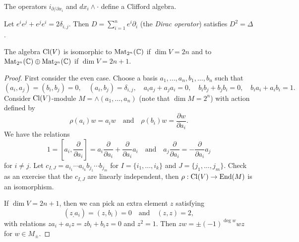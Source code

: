 \begin{example}
  The operators
  $i_{\partial / \partial x_i}$
  and $dx_i \wedge \cdot$
  define a Clifford algebra.
\end{example}

\begin{example}
  Let $e^i e^j + e^j e^i = 2 \delta_{i, j}$.
  Then $D = \sum_{i = 1}^n e^i \partial_i$
  (the \emph{Dirac operator})
  satisfies $D^2 = \Delta$.
\end{example}

\begin{theorem}
  The algebra $\operatorname{Cl}(V)$ is isomorphic
  to $\operatorname{Mat}_{2^n}(\mathbb{C})$ if
  $\dim V = 2n$ and to
  $\operatorname{Mat}_{2^n}(\mathbb{C}) \oplus \operatorname{Mat}_{2^n}(\mathbb{C})$
  if $\dim V = 2n + 1$.
\end{theorem}

\begin{proof}
  First consider the even case.
  Choose a basis $a_1, \dots, a_n, b_1, \dots, b_n$
  such that
  \[
    (a_i, a_j)
    = (b_i, b_j) = 0, \quad
    (a_i, b_j) = \delta_{i, j}, \quad
    a_i a_j + a_j a_i = 0, \quad
    b_i b_j + b_j b_i = 0, \quad
    b_i a_i + a_i b_i = 1.
  \]
  Consider $\operatorname{Cl}(V)$-module
  $M = \wedge(a_1, \dots, a_n)$ (note
  that $\dim M = 2^n$) with
  action defined by
  \[
    \rho(a_i) w = a_i w \quad
    \text{and} \quad
    \rho(b_i) w
    = \frac{\partial w}{\partial a_i}.
  \]
  We have the relations
  \[
    1 = \left[a_i, \frac{\partial}{\partial a_i}\right]
    = a_i \frac{\partial}{\partial a_i}
    + \frac{\partial}{\partial a_i} a_i
    \quad \text{and} \quad
    a_j \frac{\partial}{\partial a_i}
    = - \frac{\partial}{\partial a_i} a_j
  \]
  for $i \ne j$. Let
  $c_{I, J} = a_{i_1} \cdots a_{i_k} b_{j_1} \cdots b_{j_m}$
  for $I = \{i_1, \dots, i_k\}$
  and $J = \{j_1, \dots, j_m\}$.
  Check as an exercise that the
  $c_{I, J}$ are linearly
  independent, then
  $\rho : \operatorname{Cl}(V) \to \operatorname{End}(M)$
  is an isomorphism.

  If $\dim V = 2n + 1$, then we
  can pick an extra element $z$
  satisfying
  \[
    (z_, a_i) = (z, b_i) = 0
    \quad \text{and} \quad
    (z, z) = 2,
  \]
  with relations
  $z a_i + a_i z = z b_i + b_i z = 0$
  and $z^2 = 1$.
  Then $zw = \pm (-1)^{\deg w} wz$
  for $w \in M_{\pm}$.
\end{proof}

